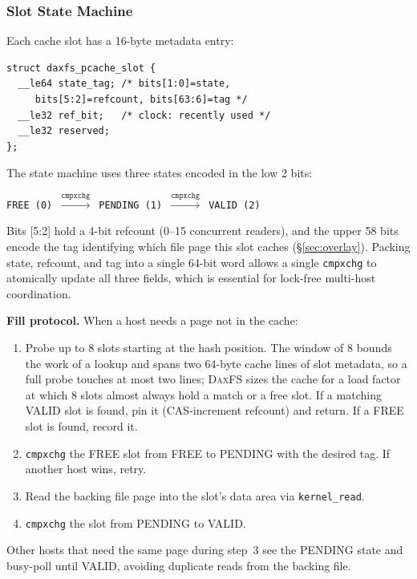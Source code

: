 \documentclass[letterpaper,twocolumn,10pt]{article}
\newcommand{\daxfs}{\textsc{DaxFS}\xspace}
\begin{document}
\subsubsection{Slot State Machine}

Each cache slot has a 16-byte metadata entry:

\begin{lstlisting}
struct daxfs_pcache_slot {
  __le64 state_tag; /* bits[1:0]=state,
     bits[5:2]=refcount, bits[63:6]=tag */
  __le32 ref_bit;   /* clock: recently used */
  __le32 reserved;
};
\end{lstlisting}

The state machine uses three states encoded in the low 2 bits:

\begin{center}
\texttt{FREE (0) $\xrightarrow{\texttt{cmpxchg}}$ PENDING (1)
  $\xrightarrow{\texttt{cmpxchg}}$ VALID (2)}
\end{center}

Bits [5:2] hold a 4-bit refcount (0--15 concurrent readers),
and the upper 58 bits encode the tag identifying which file page this
slot caches (\S\ref{sec:overlay}).  Packing state, refcount, and tag into a single 64-bit
word allows a single \texttt{cmpxchg} to atomically update all three
fields, which is essential for lock-free multi-host coordination.

\textbf{Fill protocol.}  When a host needs a page not in the cache:
\begin{enumerate}
\item Probe up to 8 slots starting at the hash position.  The window of
  8 bounds the work of a lookup and spans two 64-byte cache lines of
  slot metadata, so a full probe touches at most two lines; \daxfs
  sizes the cache for a load factor at which 8 slots almost always hold
  a match or a free slot.  If a matching VALID slot is found, pin it
  (CAS-increment refcount) and return.  If a FREE slot is found, record
  it.
\item \texttt{cmpxchg} the FREE slot from FREE to PENDING with the
  desired tag.  If another host wins, retry.
\item Read the backing file page into the slot's data area via
  \texttt{kernel\_read}.
\item \texttt{cmpxchg} the slot from PENDING to VALID.
\end{enumerate}

Other hosts that need the same page during step~3 see the PENDING
state and busy-poll until VALID, avoiding duplicate reads from the
backing file.
\end{document}
